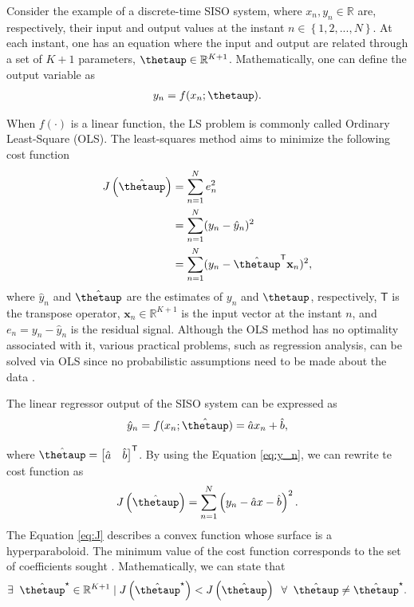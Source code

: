 \documentclass[english]{sobraep}
\newcommand{\trans}{\mathsf{T}}
\begin{document}
Consider the example of a discrete-time SISO system, where $x_n, y_n \in \mathbb{R}$ are, respectively, their input and output values at the instant $n \in \left\{1,2,...,N\right\}$. At each instant, one has an equation where the input and output are related through a set of \(K+1\) parameters, $\boldsymbol{\thetaup} \in \mathbb{R}^{K+1}$. Mathematically, one can define the output variable as
\begin{align}
    y_n = f(x_n;\boldsymbol{\thetaup}).
\end{align}

When $f(\cdot)$ is a linear function, the LS problem is commonly called Ordinary Least-Square (OLS). The least-squares method aims to minimize the following cost function
\begin{align}
    J\left( \hat{\boldsymbol{\thetaup}} \right) & = \sum_{n=1}^{N} e_n^2 \nonumber \\
    & = \sum_{n=1}^{N} (y_n - \hat{y}_n)^2 \nonumber \\
    & = \sum_{n=1}^{N} (y_n - \hat{\boldsymbol{\thetaup}}^{\trans} \mathbf{x}_n )^2,
\end{align}
where \(\hat{y}_n\) and \(\hat{\boldsymbol{\thetaup}}\) are the estimates of \(y_n\) and \(\boldsymbol{\thetaup}\), respectively, \(\trans\) is the transpose operator, \(\mathbf{x}_n \in \mathbb{R}^{K+1}\) is the input vector at the instant \(n\), and \(e_n = y_n - \hat{y}_n\) is the residual signal. Although the OLS method has no optimality associated with it, various practical problems, such as regression analysis, can be solved via OLS since no probabilistic assumptions need to be made about the data \cite{kay1993fundamentals}.

The linear regressor output of the SISO system can be expressed as
\begin{align}
    \label{eq:y_n}
    \hat{y}_n = f(x_n;\hat{\boldsymbol{\thetaup}}) = \hat{a}x_n + \hat{b},
\end{align}

where \(\hat{\boldsymbol{\thetaup}} = \begin{bmatrix} \hat{a} & \hat{b} \end{bmatrix}^\trans\). By using the Equation \eqref{eq:y_n}, we can rewrite te cost function as
\begin{align}
    \label{eq:J}
    J\left( \hat{\boldsymbol{\thetaup}} \right) = \sum_{n=1}^{N} \left( y_n - \hat{a}x - \hat{b} \right)^2.
\end{align}
The Equation \eqref{eq:J} describes a convex function whose surface is a hyperparaboloid. The minimum value of the cost function corresponds to the set of coefficients sought \cite{diniz1997adaptive}. Mathematically, we can state that
\begin{align}
    \exists \;\; \hat{\boldsymbol{\thetaup}}^{\star} \in \mathbb{R}^{K+1} \mid J\left(\hat{\boldsymbol{\thetaup}}^{\star}\right) < J\left(\hat{\boldsymbol{\thetaup}}\right) \;\; \forall \;\; \hat{\boldsymbol{\thetaup}} \neq \hat{\boldsymbol{\thetaup}}^{\star}.
\end{align}
\end{document}
